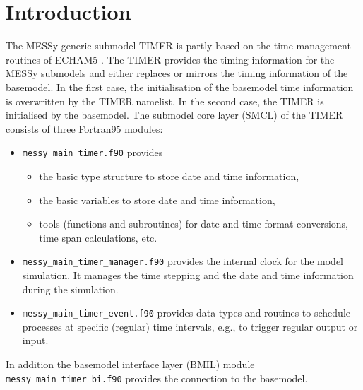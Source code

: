 \documentclass[twoside]{article}
\begin{document}
\newpage
\tableofcontents
\newpage

\newpage\twocolumn
\sloppy

\section{Introduction}
\label{sec:intro}
%
The MESSy \citep{442} generic submodel TIMER is partly based on the time
management routines of ECHAM5 \citep{478,479,480}. The TIMER provides the
timing information for the MESSy submodels and either replaces or mirrors the
timing information of the basemodel. In the first case, the initialisation of
the basemodel time information is overwritten by the TIMER namelist. In the
second case, the TIMER is initialised by the basemodel.
%
The submodel core layer (SMCL) of the TIMER consists of three Fortran95 modules:
%
\begin{itemize}
\item {\tt messy\_main\_timer.f90} provides 
      \begin{itemize}
      \item the basic type structure to store date and time information,
      \item the basic variables to store date and time information,
      \item tools (functions and subroutines) for date and time
            format conversions, time span calculations, etc.
      \end{itemize}
\item {\tt messy\_main\_timer\_manager.f90} provides the internal clock for
      the model simulation. It manages the time stepping and the date and time
      information during the simulation.
\item {\tt messy\_main\_timer\_event.f90} provides data types and routines to
      schedule processes at specific (regular) time intervals, e.g., to
      trigger regular output or input.
\end{itemize}
%
In addition the basemodel interface layer (BMIL) module
{\tt messy\_main\_timer\_bi.f90} provides the connection to the basemodel.
\end{document}
